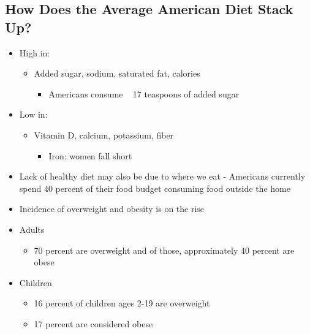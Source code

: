 \documentclass[12pt]{article}
\begin{document}
        \subsection{How Does the Average American Diet Stack Up?}
            \begin{itemize}
                \item High in:
                    \begin{itemize}
                        \item Added sugar, sodium, saturated fat, calories
                            \begin{itemize}
                                \item Americans consume ~ 17 teaspoons of added sugar
                            \end{itemize}
                    \end{itemize}
                \item Low in:
                    \begin{itemize}
                        \item Vitamin D, calcium, potassium, fiber
                            \begin{itemize}
                                \item Iron: women fall short
                            \end{itemize}
                    \end{itemize}
                \item Lack of healthy diet may also be due to where we eat - Americans currently spend 40 percent of their food budget consuming food outside the home
                \item Incidence of overweight and obesity is on the rise
                \item Adults
                    \begin{itemize}
                        \item 70 percent are overweight and of those, approximately 40 percent are obese
                    \end{itemize}
                \item Children
                    \begin{itemize}
                        \item 16 percent of children ages 2-19 are overweight
                        \item 17 percent are considered obese
                    \end{itemize}

\end{itemize}
\end{document}

